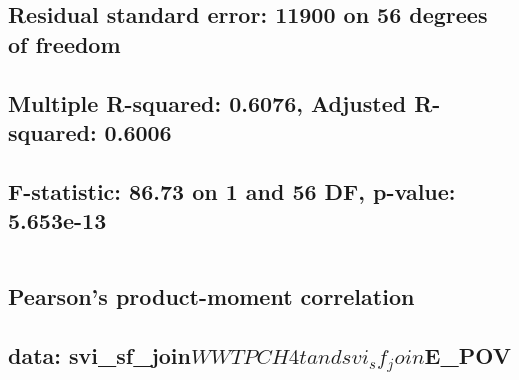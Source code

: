 \documentclass[
  12pt,
]{article}
\begin{document}
\hypertarget{section-69}{%
\subsection{}\label{section-69}}

\hypertarget{residual-standard-error-11900-on-56-degrees-of-freedom}{%
\subsection{Residual standard error: 11900 on 56 degrees of
freedom}\label{residual-standard-error-11900-on-56-degrees-of-freedom}}

\hypertarget{multiple-r-squared-0.6076-adjusted-r-squared-0.6006}{%
\subsection{Multiple R-squared: 0.6076, Adjusted R-squared:
0.6006}\label{multiple-r-squared-0.6076-adjusted-r-squared-0.6006}}

\hypertarget{f-statistic-86.73-on-1-and-56-df-p-value-5.653e-13}{%
\subsection{F-statistic: 86.73 on 1 and 56 DF, p-value:
5.653e-13}\label{f-statistic-86.73-on-1-and-56-df-p-value-5.653e-13}}

\begin{verbatim}
\end{verbatim}

\hypertarget{section-70}{%
\subsection{}\label{section-70}}

\hypertarget{pearsons-product-moment-correlation-7}{%
\subsection{Pearson's product-moment
correlation}\label{pearsons-product-moment-correlation-7}}

\hypertarget{section-71}{%
\subsection{}\label{section-71}}

\hypertarget{data-svi_sf_joinwwtpch4t-and-svi_sf_joine_pov}{%
\subsection{\texorpdfstring{data:
svi\_sf\_join\(WWTPCH4t and svi_sf_join\)E\_POV}{data: svi\_sf\_joinWWTPCH4t and svi\_sf\_joinE\_POV}}\label{data-svi_sf_joinwwtpch4t-and-svi_sf_joine_pov}}
\end{document}
